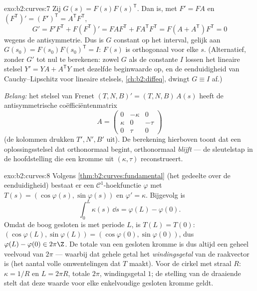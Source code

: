 \begin{solution}{exo:b2:curves:7}
Zij $G(s) = F(s)F(s)^{\mathsf T}$. Dan is, met $F' = FA$ en
$(F^{\mathsf T})' = (F')^{\mathsf T} = A^{\mathsf T}F^{\mathsf T}$,
\[
G' = F'F^{\mathsf T} + F(F^{\mathsf T})'
= FAF^{\mathsf T} + FA^{\mathsf T}F^{\mathsf T}
= F(A + A^{\mathsf T})F^{\mathsf T} = 0
\]
wegens de antisymmetrie. Dus is $G$ constant op het interval,
gelijk aan $G(s_0) = F(s_0)F(s_0)^{\mathsf T} = I$: $F(s)$ is
orthogonaal voor elke $s$. (Alternatief, zonder $G'$ tot nul te
berekenen: zowel $G$ als de constante $I$ lossen het lineaire
stelsel $Y' = YA + A^{\mathsf T}Y$ met dezelfde beginwaarde op, en
de eenduidigheid van Cauchy--Lipschitz voor lineaire stelsels,
\cref{ch:b2:diffeq}, dwingt $G \equiv I$ af.)

\emph{Belang:} het stelsel van Frenet $(T, N, B)' = (T, N,
B)\,A(s)$ heeft de antisymmetrische coëfficiëntenmatrix
\[
A = \begin{pmatrix} 0 & -\kappa & 0\\ \kappa & 0 & -\tau\\
0 & \tau & 0\end{pmatrix}
\]
(de kolommen drukken $T', N', B'$ uit). De berekening hierboven
toont dat een oplossingsstelsel dat orthonormaal begint,
orthonormaal \emph{blijft} --- de sleutelstap in de hoofdstelling
die een kromme uit $(\kappa, \tau)$ reconstrueert.
\end{solution}

\begin{solution}{exo:b2:curves:8}
Volgens \cref{thm:b2:curves:fundamental} (het gedeelte over de
eenduidigheid) bestaat er een $\mathcal{C}^1$-hoekfunctie $\varphi$
met $T(s) = (\cos\varphi(s), \sin\varphi(s))$ en $\varphi' =
\kappa$. Bijgevolg is
\[
\int_0^L \kappa(s)\,\dd s = \varphi(L) - \varphi(0) .
\]
Omdat de boog gesloten is met periode $L$, is $T(L) = T(0)$:
$(\cos\varphi(L), \sin\varphi(L)) = (\cos\varphi(0),
\sin\varphi(0))$, dus $\varphi(L) - \varphi(0) \in 2\pi\Z$. De
totale  van een gesloten kromme is dus altijd een geheel
veelvoud van $2\pi$ --- waarbij dat gehele getal het
\emph{windingsgetal} van de raakvector is (het aantal volle
omwentelingen dat $T$ maakt). Voor de cirkel met straal $R$:
$\kappa = 1/R$ en $L = 2\pi R$, totale  $2\pi$,
windingsgetal $1$; de stelling van de draaiende  stelt
dat deze waarde voor elke enkelvoudige gesloten kromme geldt.
\end{solution}

